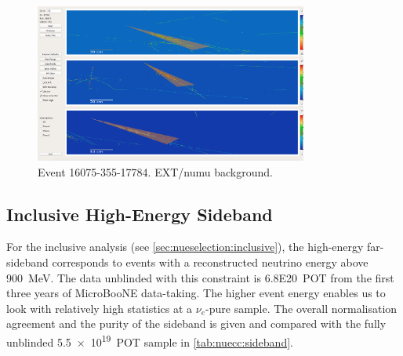 \begin{figure}[H]
    \centering
    \includegraphics[width=0.8\textwidth]{1e0p/High_E_Sideband/evds/ext2_16075_355_17784.pdf}
    \caption{Event 16075-355-17784. EXT/numu background.}
    \label{fig:evd_ext_0psel_2}
\end{figure}

\clearpage


\subsection{Inclusive High-Energy Sideband}
\label{sc:nuecc:sideband}

For the inclusive \nuecc analysis (see \cref{sec:nueselection:inclusive}), the high-energy far-sideband corresponds to events with a reconstructed neutrino energy above \SI{900}{\MeV}. The data unblinded with this constraint is \SI{6.8E20}{POT} from the first three years of MicroBooNE data-taking. The higher event energy enables us to look with relatively high statistics at a $\nu_e$-pure sample. The overall normalisation agreement and the purity of the sideband is given and compared with the fully unblinded \SI{5.5e19}{POT} sample in \cref{tab:nuecc:sideband}.

